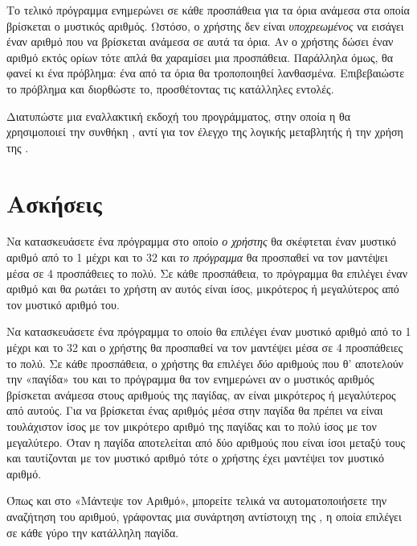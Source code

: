 \documentclass[a4paper,11pt,oneside]{book}
\begin{document}
\begin{exercise}
Το τελικό πρόγραμμα ενημερώνει σε κάθε προσπάθεια για τα όρια ανάμεσα στα οποία βρίσκεται ο μυστικός αριθμός. Ωστόσο, ο χρήστης δεν είναι \emph{υποχρεωμένος} να εισάγει έναν αριθμό που να βρίσκεται ανάμεσα σε αυτά τα όρια. Αν ο χρήστης δώσει έναν αριθμό εκτός ορίων τότε απλά θα χαραμίσει μια προσπάθεια. Παράλληλα όμως, θα φανεί κι ένα πρόβλημα: ένα από τα όρια θα τροποποιηθεί λανθασμένα. Επιβεβαιώστε το πρόβλημα και διορθώστε το, προσθέτοντας τις κατάλληλες εντολές.
\end{exercise}

\begin{exercise}
Διατυπώστε μια εναλλακτική εκδοχή του προγράμματος, στην οποία η  θα χρησιμοποιεί την συνθήκη , αντί για τον έλεγχο της λογικής μεταβλητής  ή την χρήση της .
\end{exercise}

\section{Ασκήσεις}

\begin{exercise}
Να κατασκευάσετε ένα πρόγραμμα στο οποίο \emph{ο χρήστης} θα σκέφτεται έναν μυστικό αριθμό από το 1 μέχρι και το 32 και \emph{το πρόγραμμα} θα προσπαθεί να τον μαντέψει μέσα σε 4 προσπάθειες το πολύ. Σε κάθε προσπάθεια, το πρόγραμμα θα επιλέγει έναν αριθμό και θα ρωτάει το χρήστη αν αυτός είναι ίσος, μικρότερος ή μεγαλύτερος από τον μυστικό αριθμό του.
\end{exercise}

\begin{exercise}
Να κατασκευάσετε ένα πρόγραμμα το οποίο θα επιλέγει έναν μυστικό αριθμό από το 1 μέχρι και το 32 και ο χρήστης θα προσπαθεί να τον μαντέψει μέσα σε 4 προσπάθειες το πολύ. Σε κάθε προσπάθεια, ο χρήστης θα επιλέγει \emph{δύο} αριθμούς που θ' αποτελούν την «παγίδα» του και το πρόγραμμα θα τον ενημερώνει αν ο μυστικός αριθμός βρίσκεται ανάμεσα στους αριθμούς της παγίδας, αν είναι μικρότερος ή μεγαλύτερος από αυτούς. Για να βρίσκεται ένας αριθμός μέσα στην παγίδα θα πρέπει να είναι τουλάχιστον ίσος με τον μικρότερο αριθμό της παγίδας και το πολύ ίσος με τον μεγαλύτερο.
Όταν η παγίδα αποτελείται από δύο αριθμούς που είναι ίσοι μεταξύ τους και ταυτίζονται με τον μυστικό αριθμό τότε ο χρήστης έχει μαντέψει τον μυστικό αριθμό. 

Όπως και στο «Μάντεψε τον Αριθμό», μπορείτε τελικά να αυτοματοποιήσετε την αναζήτηση του αριθμού, γράφοντας μια συνάρτηση αντίστοιχη της , η οποία επιλέγει σε κάθε γύρο την κατάλληλη παγίδα.
\end{exercise}
\end{document}
